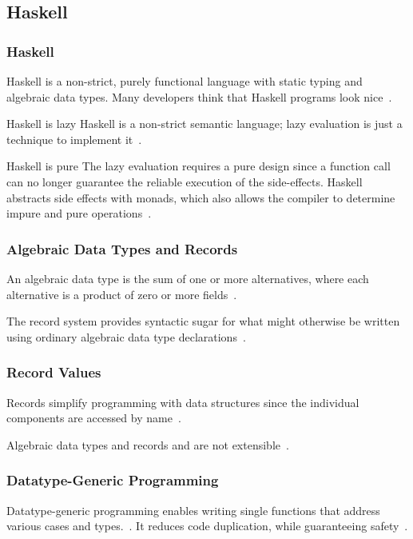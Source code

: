 \subsection{Haskell}
\begin{frame}\frametitle{Haskell}

Haskell is a non-strict, purely functional language with static typing and algebraic data types. Many developers think that Haskell programs look nice~\cite{history-of-haskell}.

\begin{block}{Haskell is lazy}
    Haskell is a non-strict semantic language; lazy evaluation is just a technique to implement it~\cite{history-of-haskell}.
\end{block}

\begin{block}{Haskell is pure}
The lazy evaluation requires a pure design since a function call can no longer guarantee the reliable execution of the side-effects. Haskell abstracts side effects with monads, which also allows the compiler to determine impure and pure operations~\cite{history-of-haskell}.
\end{block}

\end{frame}

\begin{frame}\frametitle{Algebraic Data Types and Records}

An algebraic data type is the sum of one or more alternatives, where each alternative is a product of zero or more fields~\cite{history-of-haskell}. 
        

The record system provides syntactic sugar for what might otherwise be written using ordinary algebraic data type declarations~\cite{lw-ext-records}. 


\end{frame}

\begin{frame}\frametitle{Record Values}

Records simplify programming with data structures since the individual components are accessed by name~\cite{lw-ext-records}.


Algebraic data types and records and are not extensible~\cite{lw-ext-records,trees-that-grow}. 

\end{frame}

\begin{frame}\frametitle{Datatype-Generic Programming}
    
Datatype-generic programming enables writing single functions that address various cases and types.~\cite{derivable-type-classes}. 
It reduces code duplication, while guaranteeing safety~\cite{datatype-generic-programming}.


\end{frame}